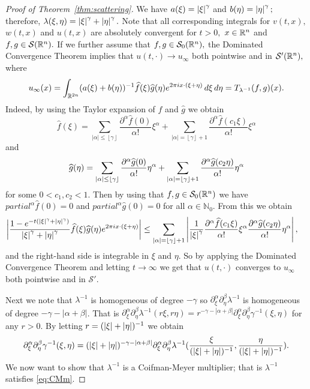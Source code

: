 
 \begin{proof}[Proof of Theorem~\ref{thm:scattering}] We have $a(\xi)=\left\vert \xi \right\vert^\gamma$ and $b(\eta)=\left\vert \eta \right\vert^\gamma;$ therefore, $\lambda(\xi,\eta)=\left\vert \xi \right\vert^\gamma+\left\vert \eta \right\vert^\gamma.$ Note that all corresponding integrals for $v(t,x),$ $w(t,x)$ and $u(t,x)$ are absolutely convergent for $t>0,$ $x\in{{\mathbb R}^n}$ and $f,g\in {\mathcal{S}}({{\mathbb R}^n}).$ If we further assume that $f,g\in {\mathcal{S}_0}({{\mathbb R}^n}),$ the Dominated Convergence Theorem implies that $u(t,\cdot)\to u_\infty$  both pointwise and in ${\mathcal{S}'}({{\mathbb R}^n}),$ where
$$
u_\infty(x)=\int_{\mathbb{R}^{2n}} (a(\xi)+b(\eta))^{-1}\widehat{f}(\xi)\widehat{g}(\eta)e^{2\pi i x \cdot (\xi + \eta)}\, d\xi\, d\eta=T_{\lambda^{-1}} (f,g)(x).
$$
Indeed, by using the Taylor expansion of $\widehat{f}$ and $\widehat{g}$ we obtain
\[\widehat{f}(\xi) = 
\sum_{|\alpha|\leq 
\left\lfloor\gamma\right\rfloor} 
\frac{\partial^\alpha \widehat{f}(0)}{\alpha !}\xi^\alpha
 + \sum_{|\alpha| = 
 \left\lfloor\gamma\right\rfloor + 1} \frac{\partial^\alpha \widehat{f}(c_1 \xi)}{\alpha !}\xi^\alpha \]
and 
\[\widehat{g}(\eta) = \sum_{\left\vert \alpha \right\vert\leq \left\lfloor\gamma\right\rfloor} \frac{\partial^\alpha \widehat{g}(0)}{\alpha !}\eta^\alpha + \sum_{\left\vert \alpha \right\vert = \left\lfloor\gamma\right\rfloor + 1} \frac{\partial^\alpha \widehat{g}(c_2 \eta)}{\alpha !}\eta^\alpha \]
for some $0<c_1 , c_2 <1$. Then by using that $f,g \in {\mathcal{S}_0}({{\mathbb R}^n})$ we have $partial^\alpha \widehat{f}(0) = 0$ and $partial^\alpha \widehat{g}(0) = 0$ for all $\alpha \in \mathbb{N}_0$. From this we obtain 
\begin{align*}
\left\vert \frac{1-e^{-t(\left\vert \xi \right\vert^\gamma + \left\vert \eta \right\vert^\gamma)}}{\left\vert \xi \right\vert^\gamma + \left\vert \eta \right\vert^\gamma}\widehat{f}(\xi)\widehat{g}(\eta) e^{2\pi i x\cdot (\xi + \eta)} \right\vert &\leq \sum_{\left\vert \alpha \right\vert = \left\lfloor\gamma\right\rfloor + 1} \left\vert \frac{1}{\left\vert \xi \right\vert^\gamma} \frac{\partial^\alpha \widehat{f}(c_1 \xi)}{\alpha !}\xi^\alpha\frac{\partial^\alpha \widehat{g}(c_2 \eta)}{\alpha !}\eta^\alpha \right\vert, 
\end{align*}
and the right-hand side is integrable in $\xi$ and $\eta$. So by applying the Dominated Convergence Theorem and letting $t \rightarrow \infty$ we get that $u(t,\cdot)$ converges to $u_\infty$ both pointwise and in $\mathcal{S}'$. 

Next we note that $\lambda^{-1}$ is homogeneous of degree $-\gamma$ so $\partial^\alpha_\xi \partial^\beta_\eta \lambda^{-1}$ is homogeneous of degree $-\gamma -|\alpha + \beta|$. That is $\partial^\alpha_\xi \partial^\beta_\eta \lambda^{-1} (r\xi, r\eta) = r^{-\gamma -|\alpha+\beta|}\partial^\alpha_\xi \partial^\beta_\eta \gamma^{-1}(\xi,\eta)$ for any $r>0$. By letting $r = (\left\vert \xi \right\vert + \left\vert \eta \right\vert)^{-1}$ we obtain 
$$\partial^\alpha_\xi \partial^\beta_\eta \gamma^{-1}(\xi,\eta) = (\left\vert \xi \right\vert + \left\vert \eta \right\vert)^{-\gamma -|\alpha+\beta|} \partial^\alpha_\xi \partial^\beta_\eta \lambda^{-1} (\frac{\xi}{(\left\vert \xi \right\vert + \left\vert \eta \right\vert)^{-1}}, \frac{\eta}{(\left\vert \xi \right\vert + \left\vert \eta \right\vert)^{-1}}).$$
We now want to show that $\lambda^{-1}$ is a Coifman-Meyer multiplier; that is $\lambda^{-1}$ satisfies \eqref{eq:CMm}.


\end{proof}
